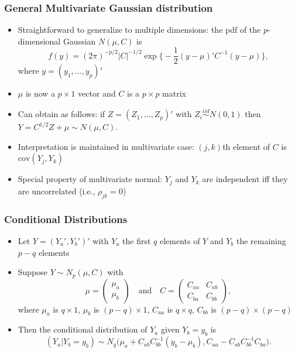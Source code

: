 \documentclass[handout]{beamer}
\begin{document}
\begin{frame}
\frametitle{General Multivariate Gaussian distribution}
\begin{itemize}[<+-| alert@+>]
    \item Straightforward to generalize to multiple dimensions: the pdf of the $p$-dimensional Gaussian $N(\mu,C)$ is
$$f(y) = (2\pi)^{-p/2}|C|^{-1/2} \exp\bigg\{ -\frac{1}{2} (y - \mu)'C^{-1}(y - \mu) \bigg\},$$
where $y = (y_1,\ldots,y_p)'$

\item $\mu$ is now a $p \times 1$ vector and $C$ is a $p \times p$ matrix 

\item Can obtain as follows: if $Z=(Z_1,\ldots,Z_p)'$ with $Z_i\stackrel{iid}{\sim} N(0,1)$ then $Y = C^{1/2}Z+\mu\sim N(\mu,C)$.

\item Interpretation is maintained in multivariate case: $(j,k)$th element of $C$ is $\mbox{cov}(Y_j,Y_k)$

\item Special property of multivariate normal:   $Y_j$ and $Y_k$
    are independent iff they are uncorrelated (i.e., $\rho_{jk}=0$)
\end{itemize}
\end{frame}

\begin{frame}
\frametitle{Conditional Distributions}
\begin{itemize}[<+-| alert@+>]
\item Let $Y = (Y_a', Y_b')'$ with $Y_a$ the first $q$ elements of $Y$ and $Y_b$ the remaining $p-q$ elements

\item Suppose $Y  \sim N_p( \mu, C)$ with 
$$\mu = \left( \begin{array}{c}
\mu_a \\
\mu_b
\end{array}\right)\quad \mbox{and}\quad
C = \left( \begin{array}{cc}
C_{aa} & C_{ab} \\
C_{ba} & C _{bb} 
\end{array} \right),$$
where $\mu_a$ is $q \times 1$, $\mu_b$ is $(p-q) \times 1$, $C_{aa}$ is $q \times q$, $C_{bb}$ is $(p-q) \times (p-q)$
 
\item Then the conditional distribution of $Y_a$ given $Y_b=y_b$ is
$$(Y_a|Y_b=y_b) \sim N_q\big( \mu_a + C_{ab}C_{bb}^{-1}(y_b-\mu_b), C_{aa}-C_{ab}C_{bb}^{-1}C_{ba} \big).$$
\end{itemize}
\end{frame}
\end{document}
